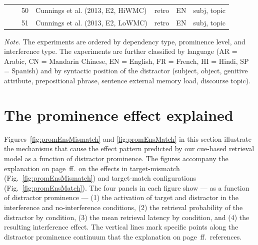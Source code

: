 \documentclass{cambridge7A}\usepackage[]{graphicx}\usepackage[]{color}
\begin{document}
\begin{subappendices}
\begin{table}[ht]
{\begin{tabular}{llrllll}
               &            & 50    & Cunnings et al. (2013, E2, HiWMC)   & retro   & EN   & subj, topic \\
               &            & 51    & Cunnings et al. (2013, E2, LoWMC)   & retro   & EN   & subj, topic \\
\end{tabular}
\begin{tablenotes}
\item \emph{Note.} The experiments are ordered by dependency type, prominence level, and interference type. 
The experiments are further classified by language (AR = Arabic, CN = Mandarin Chinese, EN = English, FR = French, HI = Hindi, SP = Spanish) and by syntactic position of the distractor (subject, object, genitive attribute, prepositional phrase, sentence external memory load, discourse topic). 
\end{tablenotes}
}
\end{table}






\clearpage
\section{The prominence effect explained}
\label{sec:appendixProm}
Figures~\ref{fig:promEnsMismatch} and \ref{fig:promEnsMatch} in this section illustrate the mechanisms that cause the effect pattern predicted by our cue-based retrieval model as a function of distractor prominence. The figures accompany the explanation on page~\pageref{promexpl}ff.\ on the effects in target-mismatch (Fig.~\ref{fig:promEnsMismatch}) and target-match configurations (Fig.~\ref{fig:promEnsMatch}).
The four panels in each figure show --- as a function of distractor prominence --- (1) the activation of target and distractor in the interference and no-interference conditions, (2) the retrieval probability of the distractor by condition, (3) the mean retrieval latency by condition, and (4) the resulting interference effect. The vertical lines mark specific points along the distractor prominence continuum that the explanation on page~\pageref{promexpl}ff.\ references.



\end{subappendices}
\end{document}
